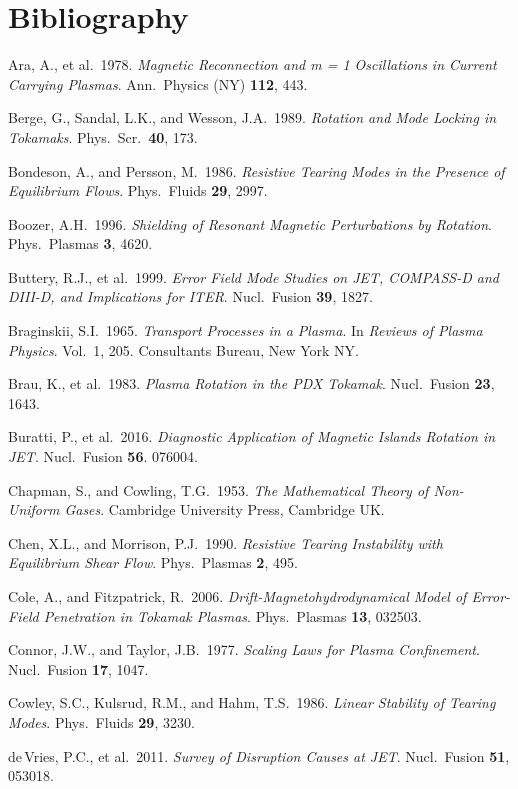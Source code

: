 \documentclass[notitlepage,12pt]{article}
\begin{document}
\newpage
\section*{Bibliography}
\begin{description}
\item Ara, A., et al.\ 1978. {\em Magnetic Reconnection and m = 1 Oscillations in Current Carrying Plasmas}. Ann.\ Physics (NY) 
{\bf 112}, 443. 
\item Berge, G., Sandal, L.K., and Wesson, J.A.\ 1989. {\em Rotation and Mode Locking in Tokamaks}. Phys.\ Scr.\ {\bf 40}, 173.
\item Bondeson, A., and Persson, M.\ 1986. {\em Resistive Tearing Modes in the Presence of Equilibrium Flows}. Phys.\ Fluids
{\bf 29}, 2997. 
\item Boozer, A.H.\ 1996. {\em Shielding of Resonant Magnetic Perturbations by Rotation}. Phys.\ Plasmas {\bf 3}, 4620.
\item Buttery, R.J., et al.\ 1999. {\em Error Field Mode Studies on JET, COMPASS-D and DIII-D, and Implications for ITER}. Nucl.\ Fusion {\bf 39}, 1827. 
\item Braginskii, S.I.\ 1965. {\em Transport Processes in a Plasma}. In {\em Reviews of Plasma Physics}.  Vol.~1, 205. Consultants Bureau, New York NY. 
\item Brau, K., et al.\ 1983. {\em Plasma Rotation in the PDX Tokamak}. Nucl.\ Fusion {\bf 23}, 1643.
\item Buratti, P., et al.\ 2016. {\em Diagnostic Application of Magnetic Islands Rotation in JET}.  Nucl.\ Fusion {\bf 56}. 076004. 
\item Chapman, S., and Cowling, T.G.\ 1953. {\em The Mathematical Theory of Non-Uniform Gases}. Cambridge University Press, Cambridge UK. 
\item Chen, X.L., and Morrison, P.J.\ 1990. {\em Resistive Tearing Instability with Equilibrium Shear Flow}. Phys.\ Plasmas {\bf 2}, 495. 
\item Cole, A., and Fitzpatrick, R.\ 2006. {\em Drift-Magnetohydrodynamical Model of Error-Field Penetration in Tokamak
Plasmas}. Phys.\ Plasmas {\bf 13}, 032503. 
\item Connor, J.W., and Taylor, J.B.\ 1977. {\em Scaling Laws for Plasma Confinement}. Nucl.\ Fusion {\bf 17}, 1047.
\item Cowley, S.C.,  Kulsrud, R.M., and Hahm, T.S.\ 1986. {\em Linear Stability of Tearing Modes}. Phys.\ Fluids {\bf 29}, 3230. 
\item de\,Vries, P.C., et al.\ 2011. {\em Survey of Disruption Causes at JET}. Nucl.\ Fusion {\bf 51}, 053018.

\end{description}
\end{document}

